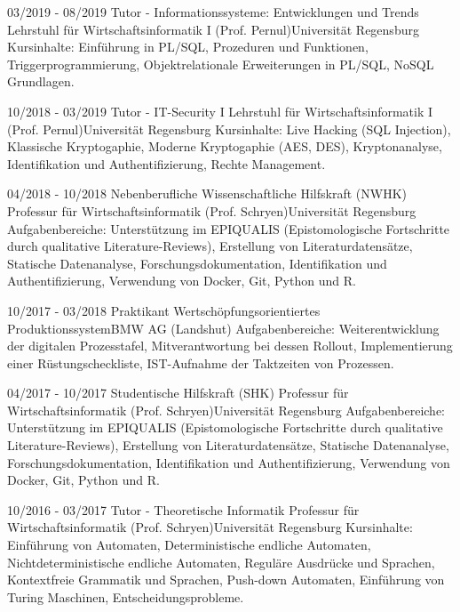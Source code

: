 \cvevent
{03/2019 - 08/2019}
{Tutor - Informationssysteme: Entwicklungen und Trends}
{Lehrstuhl für Wirtschaftsinformatik I (Prof. Pernul)\newline Universität Regensburg}
{Kursinhalte: Einführung in PL/SQL, Prozeduren und Funktionen, Triggerprogrammierung, Objektrelationale Erweiterungen in PL/SQL, NoSQL Grundlagen.}
\vfill\null
\vfill\null



\cvevent
{10/2018 - 03/2019}
{Tutor - IT-Security I}
{Lehrstuhl für Wirtschaftsinformatik I (Prof. Pernul)\newline Universität Regensburg}
{Kursinhalte: Live Hacking (SQL Injection), Klassische Kryptogaphie, Moderne Kryptogaphie (AES, DES), Kryptonanalyse, Identifikation und Authentifizierung, Rechte Management.}
\vfill\null


\cvevent
{04/2018 - 10/2018}
{Nebenberufliche Wissenschaftliche Hilfskraft (NWHK)}
{Professur für Wirtschaftsinformatik (Prof. Schryen)\newline Universität Regensburg}
{Aufgabenbereiche: Unterstützung im EPIQUALIS (Epistomologische Fortschritte durch qualitative Literature-Reviews), Erstellung von Literaturdatensätze, Statische Datenanalyse, Forschungsdokumentation, Identifikation und Authentifizierung, Verwendung von Docker, Git, Python und R.}
\vfill\null



\cvevent
{10/2017 - 03/2018}
{Praktikant}
{Wertschöpfungsorientiertes Produktionssystem\newline BMW AG (Landshut)}
{Aufgabenbereiche: Weiterentwicklung der digitalen Prozesstafel, Mitverantwortung bei dessen Rollout, Implementierung einer Rüstungscheckliste, IST-Aufnahme der Taktzeiten von Prozessen.}
\vfill\null

\cvevent
{04/2017 - 10/2017}
{Studentische Hilfskraft (SHK)}
{Professur für Wirtschaftsinformatik (Prof. Schryen)\newline Universität Regensburg}
{Aufgabenbereiche: Unterstützung im EPIQUALIS (Epistomologische Fortschritte durch qualitative Literature-Reviews), Erstellung von Literaturdatensätze, Statische Datenanalyse, Forschungsdokumentation, Identifikation und Authentifizierung, Verwendung von Docker, Git, Python und R.}
\vfill\null


\cvevent
{10/2016 - 03/2017}
{Tutor - Theoretische Informatik}
{Professur für Wirtschaftsinformatik (Prof. Schryen)\newline Universität Regensburg}
{Kursinhalte: Einführung von Automaten, Deterministische endliche Automaten, Nichtdeterministische endliche Automaten, Reguläre Ausdrücke und Sprachen, Kontextfreie Grammatik und Sprachen, Push-down Automaten, Einführung von Turing Maschinen, Entscheidungsprobleme.}
\vfill\null



